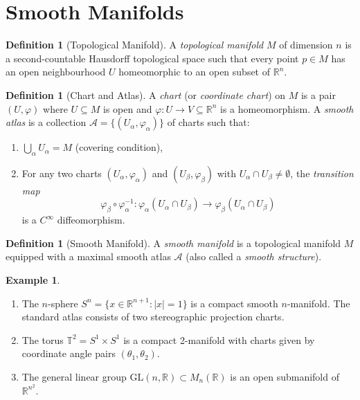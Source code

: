 \documentclass[12pt,a4paper]{amsart}
\theoremstyle{definition}
\newtheorem{definition}[theorem]{Definition}
\newtheorem{example}[theorem]{Example}
\begin{document}
\section{Smooth Manifolds}
\label{sec:manifolds}

\begin{definition}[Topological Manifold]
A \emph{topological manifold} $M$ of dimension $n$ is a second-countable
Hausdorff topological space such that every point $p \in M$ has an open
neighbourhood $U$ homeomorphic to an open subset of $\mathbb{R}^n$.
\end{definition}

\begin{definition}[Chart and Atlas]
A \emph{chart} (or \emph{coordinate chart}) on $M$ is a pair $(U, \varphi)$
where $U \subseteq M$ is open and $\varphi: U \to V \subseteq \mathbb{R}^n$
is a homeomorphism. A \emph{smooth atlas} is a collection
$\mathcal{A} = \{(U_\alpha, \varphi_\alpha)\}$ of charts such that:
\begin{enumerate}[label=(\roman*)]
  \item $\bigcup_\alpha U_\alpha = M$ (covering condition),
  \item For any two charts $(U_\alpha, \varphi_\alpha)$ and
        $(U_\beta, \varphi_\beta)$ with $U_\alpha \cap U_\beta \neq \emptyset$,
        the \emph{transition map}
        \[
          \varphi_\beta \circ \varphi_\alpha^{-1}:
          \varphi_\alpha(U_\alpha \cap U_\beta) \to
          \varphi_\beta(U_\alpha \cap U_\beta)
        \]
        is a $C^\infty$ diffeomorphism.
\end{enumerate}
\end{definition}

\begin{definition}[Smooth Manifold]
A \emph{smooth manifold} is a topological manifold $M$ equipped with a maximal
smooth atlas $\mathcal{A}$ (also called a \emph{smooth structure}).
\end{definition}

\begin{example}
\begin{enumerate}[label=(\alph*)]
  \item The $n$-sphere $S^n = \{x \in \mathbb{R}^{n+1} : |x| = 1\}$ is a
        compact smooth $n$-manifold. The standard atlas consists of two
        stereographic projection charts.
  \item The torus $\mathbb{T}^2 = S^1 \times S^1$ is a compact 2-manifold
        with charts given by coordinate angle pairs $(\theta_1, \theta_2)$.
  \item The general linear group $\mathrm{GL}(n, \mathbb{R}) \subset M_n(\mathbb{R})$
        is an open submanifold of $\mathbb{R}^{n^2}$.
\end{enumerate}
\end{example}
\end{document}
